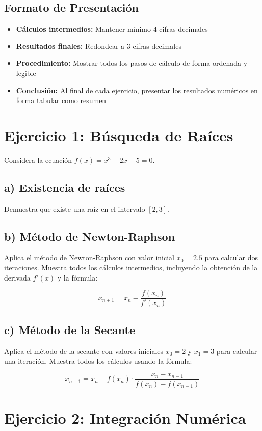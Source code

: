 \documentclass[12pt,a4paper]{article}
\begin{document}
\subsection*{Formato de Presentación}
\begin{itemize}
\item \textbf{Cálculos intermedios:} Mantener mínimo 4 cifras decimales
\item \textbf{Resultados finales:} Redondear a 3 cifras decimales
\item \textbf{Procedimiento:} Mostrar todos los pasos de cálculo de forma ordenada y legible
\item \textbf{Conclusión:} Al final de cada ejercicio, presentar los resultados numéricos en forma tabular como resumen
\end{itemize}

\section*{Ejercicio 1: Búsqueda de Raíces}

Considera la ecuación $f(x) = x^3 - 2x - 5 = 0$.

\subsection*{a) Existencia de raíces}
Demuestra que existe una raíz en el intervalo $[2, 3]$.

\subsection*{b) Método de Newton-Raphson}
Aplica el método de Newton-Raphson con valor inicial $x_0 = 2.5$ para calcular dos iteraciones. Muestra todos los cálculos intermedios, incluyendo la obtención de la derivada $f'(x)$ y la fórmula:

$$x_{n+1} = x_n - \frac{f(x_n)}{f'(x_n)}$$

\subsection*{c) Método de la Secante}
Aplica el método de la secante con valores iniciales $x_0 = 2$ y $x_1 = 3$ para calcular una iteración. Muestra todos los cálculos usando la fórmula:

$$x_{n+1} = x_n - f(x_n) \cdot \frac{x_n - x_{n-1}}{f(x_n) - f(x_{n-1})}$$

\section*{Ejercicio 2: Integración Numérica}
\end{document}
